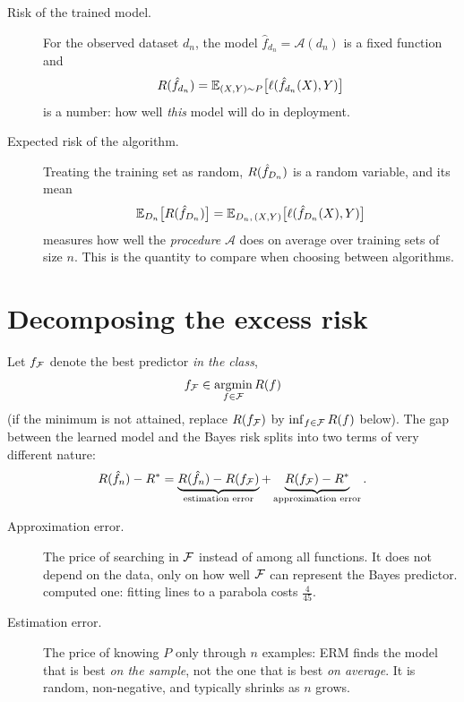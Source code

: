 \begin{notechapter}
\begin{description}
  \item[Risk of the trained model.] For the observed dataset $d_n$, the model
        $\hat f_{d_n} = \mathcal A(d_n)$ is a fixed function and
        \[
          R(\hat f_{d_n}) = \mathbb{E}_{(X,Y)\sim P}\bigl[\ell(\hat f_{d_n}(X), Y)\bigr]
        \]
        is a number: how well \emph{this} model will do in deployment.
  \item[Expected risk of the algorithm.] Treating the training set as random,
        $R(\hat f_{D_n})$ is a random variable, and its mean
        \[
          \mathbb{E}_{D_n}\bigl[R(\hat f_{D_n})\bigr]
          = \mathbb{E}_{D_n,\,(X,Y)}\bigl[\ell(\hat f_{D_n}(X), Y)\bigr]
        \]
        measures how well the \emph{procedure} $\mathcal A$ does on average
        over training sets of size $n$. This is the quantity to compare when
        choosing between algorithms.
\end{description}

\section{Decomposing the excess risk}\label{erm:sec:decomposition}

Let $f_{\mathcal{F}}$ denote the best predictor \emph{in the class},
\[
  f_{\mathcal{F}} \in \operatorname*{argmin}_{f\in\mathcal{F}} R(f)
\]
(if the minimum is not attained, replace $R(f_{\mathcal{F}})$ by $\inf_{f\in\mathcal{F}}R(f)$
below). The gap between the learned model and the Bayes risk splits into two
terms of very different nature:
\begin{equation}\label{erm:eq:decomposition}
  R(\hat f_n) - R^*
  = \underbrace{R(\hat f_n) - R(f_{\mathcal{F}})}_{\text{estimation error}}
  + \underbrace{R(f_{\mathcal{F}}) - R^*}_{\text{approximation error}} .
\end{equation}

\begin{description}
  \item[Approximation error.] The price of searching in $\mathcal{F}$ instead of among
        all functions. It does not depend on the data, only on how well $\mathcal{F}$
        can represent the Bayes predictor. 
        computed one: fitting lines to a parabola costs $\frac4{45}$.
  \item[Estimation error.] The price of knowing $P$ only through $n$ examples:
        ERM finds the model that is best \emph{on the sample}, not the one
        that is best \emph{on average}. It is random, non-negative, and
        typically shrinks as $n$ grows.
\end{description}


\end{notechapter}
